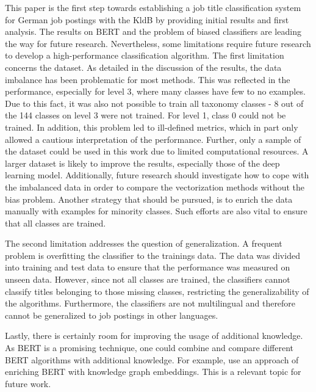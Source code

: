 \documentclass[12pt, a4paper, titlepage]{article}
\begin{document}
This paper is the first step towards establishing a job title classification system for German job postings with the \ac{KldB} by providing initial results and first analysis. The results on \ac{BERT} and the problem of biased classifiers are leading the way for future research. Nevertheless, some limitations require future research to develop a high-performance classification algorithm. The first limitation concerns the dataset. As detailed in the discussion of the results, the data imbalance has been problematic for most methods. This was reflected in the performance, especially for level 3, where many classes have few to no examples. Due to this fact, it was also not possible to train all taxonomy classes - 8 out of the 144 classes on level 3 were not trained. For level 1, class 0 could not be trained. In addition, this problem led to ill-defined metrics, which in part only allowed a cautious interpretation of the performance. Further, only a sample of the dataset could be used in this work due to limited computational resources. A larger dataset is likely to improve the results, especially those of the deep learning model. Additionally, future research should investigate how to cope with the imbalanced data in order to compare the vectorization methods without the bias problem. Another strategy that should be pursued, is to enrich the data manually with examples for minority classes. Such efforts are also vital to ensure that all classes are trained.

The second limitation addresses the question of generalization. A frequent problem is overfitting the classifier to the trainings data. The data was divided into training and test data to ensure that the performance was measured on unseen data. However, since not all classes are trained, the classifiers cannot classify titles belonging to those missing classes, restricting the generalizability of the algorithms. Furthermore, the classifiers are not multilingual and therefore cannot be generalized to job postings in other languages. 

Lastly, there is certainly room for improving the usage of additional knowledge. As \ac{BERT} is a promising technique, one could combine and compare different \ac{BERT} algorithms with additional knowledge. For example, \citet{ostendorff2019} use an approach of enriching \ac{BERT} with knowledge graph embeddings. This is a relevant topic for future work. 
\end{document}
